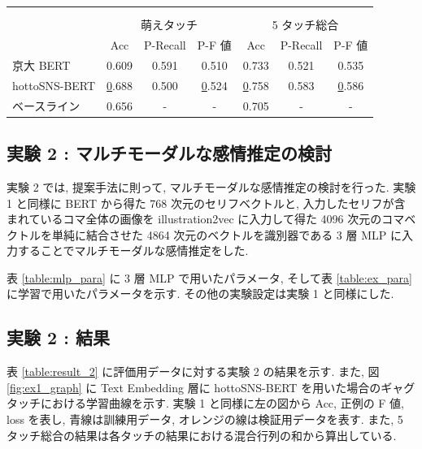 \begin{table}[!hb]
\begin{center}
{\begin{tabular}{lcccccc}
 & \multicolumn{1}{l}{} & \multicolumn{1}{l}{} & \multicolumn{1}{l}{} & \multicolumn{1}{l}{} & \multicolumn{1}{l}{} & \multicolumn{1}{l}{} \\
 & \multicolumn{1}{l}{} & \multicolumn{1}{l}{} & \multicolumn{1}{l}{} & \multicolumn{1}{l}{} & \multicolumn{1}{l}{} & \multicolumn{1}{l}{} \\ \hline
 & \multicolumn{3}{c}{萌えタッチ} & \multicolumn{3}{c}{5 タッチ総合} \\
 & Acc & P-Recall & P-F 値 & Acc & P-Recall & P-F 値 \\ \hline
京大 BERT & 0.609 & 0.591 & 0.510 & 0.733 & 0.521 & 0.535 \\
hottoSNS-BERT & {\ul 0.688} & 0.500 & {\ul 0.524} & {\ul 0.758} & 0.583 & {\ul 0.586} \\ \hline
ベースライン & 0.656 & - & - & 0.705 & - & -
\end{tabular}
}
\end{center}
\end{table}

\newpage
\changeindent{0cm}
\subsection{実験 2 : マルチモーダルな感情推定の検討}
\changeindent{2cm}

実験 2 では, 提案手法に則って, マルチモーダルな感情推定の検討を行った.
実験 1 と同様に BERT から得た 768 次元のセリフベクトルと, 入力したセリフが含まれているコマ全体の画像を illustration2vec に入力して得た 4096 次元のコマベクトルを単純に結合させた 4864 次元のベクトルを識別器である 3 層 MLP に入力することでマルチモーダルな感情推定をした.

表 \ref{table:mlp_para} に 3 層 MLP で用いたパラメータ, そして表 \ref{table:ex_para} に学習で用いたパラメータを示す. その他の実験設定は実験 1 と同様にした.


\changeindent{0cm}
\subsection{実験 2 : 結果}
\changeindent{2cm}

表 \ref{table:result_2} に評価用データに対する実験 2 の結果を示す. また, 図 \ref{fig:ex1_graph} に Text Embedding 層に hottoSNS-BERT を用いた場合のギャグタッチにおける学習曲線を示す. 実験 1 と同様に左の図から Acc, 正例の F 値, loss を表し, 青線は訓練用データ, オレンジの線は検証用データを表す. また, 5 タッチ総合の結果は各タッチの結果における混合行列の和から算出している.

